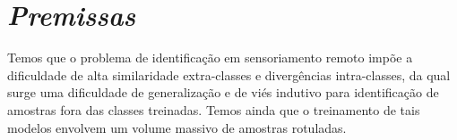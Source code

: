 






\section{\textit{Premissas}}\label{sec:Cap3_Premissas}

Temos que o problema de identificação em sensoriamento remoto impõe a dificuldade de alta similaridade extra-classes e divergências intra-classes, da qual surge uma dificuldade de generalização e de viés indutivo para identificação de amostras fora das classes treinadas. Temos ainda que o treinamento de tais modelos envolvem um volume massivo de amostras rotuladas. 




